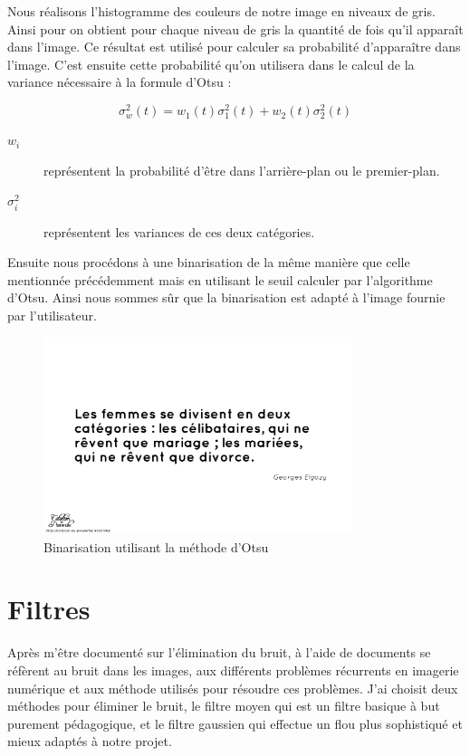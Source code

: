 \documentclass[11pt]{report}
\begin{document}
Nous réalisons l'histogramme des couleurs de notre image en niveaux de gris. Ainsi pour on obtient pour chaque niveau de gris la quantité de fois qu'il apparaît dans l'image. Ce résultat est utilisé pour calculer sa probabilité d’apparaître dans l’image. C'est ensuite cette probabilité qu’on utilisera dans le calcul de la variance nécessaire à la formule d’Otsu :

\[ \sigma ^{2}_{w} \left( t\right) = w_{1}\left( t\right) \sigma ^{2}_{1}\left( t\right) + w_{2}\left( t\right) \sigma ^{2}_{2}\left( t\right) \]

\begin{description}
\item[$w_{i}$] représentent la probabilité d'être dans l'arrière-plan ou le premier-plan.
\item[$\sigma ^{2}_{i}$] représentent les variances de ces deux catégories.
\end{description}

\medskip

Ensuite nous procédons à une binarisation de la même manière que celle mentionnée précédemment mais en utilisant le seuil calculer par l'algorithme d'Otsu. Ainsi nous sommes sûr que la binarisation est adapté à l’image fournie par l'utilisateur.

\begin{figure}[htbp]
\centering
\includegraphics[width=9cm]{b_otsu.png}
\caption{Binarisation utilisant la méthode d'Otsu}
\end{figure}

\section{Filtres}

Après m'être documenté sur l'élimination du bruit, à l'aide de documents se réfèrent au bruit dans les images, aux différents problèmes récurrents en imagerie numérique et aux méthode utilisés pour résoudre ces problèmes. J'ai choisit deux méthodes pour éliminer le bruit, le filtre moyen qui est un filtre basique à but purement pédagogique, et le filtre gaussien qui effectue un flou plus sophistiqué et mieux adaptés à notre projet. 
\end{document}
